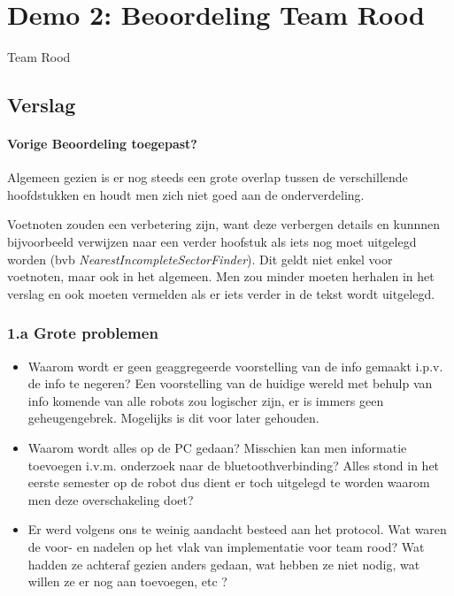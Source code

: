 \documentclass[12pt,a4paper]{report}
\begin{document}
\section{Demo 2: Beoordeling Team Rood}
\begin{center}
Team Rood
\end{center}

\subsection{ Verslag} 
     
\paragraph{Vorige Beoordeling toegepast?}

Algemeen gezien is er nog steeds een grote overlap tussen de verschillende hoofdstukken en houdt men zich niet goed aan de onderverdeling.
\par Voetnoten zouden een verbetering zijn, want deze verbergen details en kunnnen bijvoorbeeld verwijzen naar een verder hoofstuk als iets nog moet uitgelegd worden (bvb \textit{NearestIncompleteSectorFinder}). Dit geldt niet enkel voor voetnoten, maar ook in het algemeen. Men zou minder moeten herhalen in het verslag en ook moeten vermelden als er iets verder in de tekst wordt uitgelegd.
\subsubsection{1.a Grote problemen}

\begin{itemize}
	\item Waarom wordt er geen geaggregeerde voorstelling van de info gemaakt i.p.v. de info te negeren? Een voorstelling van de huidige wereld met behulp van info komende van alle robots zou logischer zijn, er is immers geen geheugengebrek. Mogelijks is dit voor later gehouden.
	\item Waarom wordt alles op de PC gedaan? Misschien kan men informatie toevoegen i.v.m. onderzoek naar de bluetoothverbinding? Alles stond in het eerste semester op de robot dus dient er toch uitgelegd te worden waarom men deze overschakeling doet?
	\item Er werd volgens ons te weinig aandacht besteed aan het protocol. Wat waren de voor- en nadelen op het vlak van implementatie voor team rood? Wat hadden ze achteraf gezien anders gedaan, wat hebben ze niet nodig, wat willen ze er nog aan toevoegen, etc ?
\end{itemize}
\end{document}
